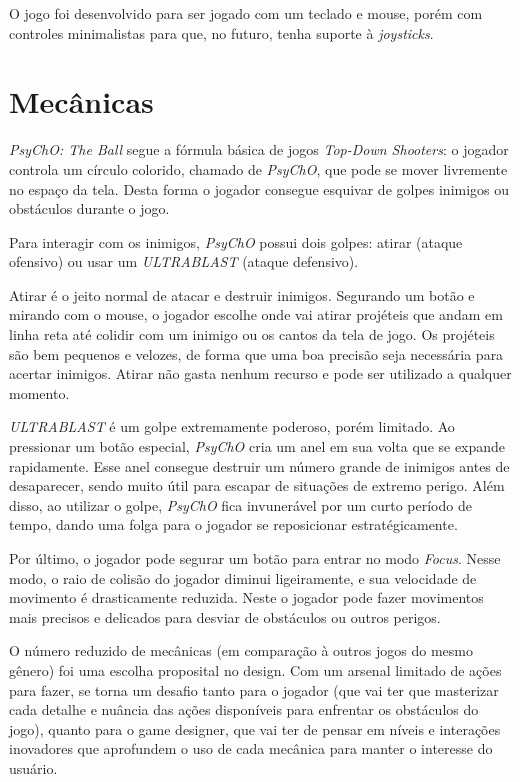 O jogo foi desenvolvido para ser jogado com um teclado e mouse, porém com controles minimalistas para que, no futuro, tenha suporte à \textit{joysticks}.

\section{Mecânicas}
\label{sec:mecanicas}

\textit{PsyChO: The Ball} segue a fórmula básica de jogos \textit{Top-Down Shooters}: o jogador controla um círculo colorido, chamado de \textit{PsyChO},
que pode se mover livremente no espaço da tela. Desta forma o jogador consegue esquivar de golpes inimigos ou obstáculos durante o jogo.

Para interagir com os inimigos, \textit{PsyChO} possui dois golpes: atirar (ataque ofensivo) ou usar um \textit{ULTRABLAST} (ataque defensivo).

Atirar é o jeito normal de atacar e destruir inimigos. Segurando um botão e mirando com o mouse, o jogador escolhe onde vai atirar projéteis que andam em
linha reta até colidir com um inimigo ou os cantos da tela de jogo. Os projéteis são bem pequenos e velozes, de forma que uma boa precisão seja necessária para
acertar inimigos. Atirar não gasta nenhum recurso e pode ser utilizado a qualquer momento.

\textit{ULTRABLAST} é um golpe extremamente poderoso, porém limitado. Ao pressionar um botão especial, \textit{PsyChO} cria um anel
em sua volta que se expande rapidamente. Esse anel consegue destruir um número grande de inimigos antes de desaparecer, sendo muito útil para escapar de situações
de extremo perigo. Além disso, ao utilizar o golpe, \textit{PsyChO} fica invunerável por um curto período de tempo, dando uma folga para o jogador
se reposicionar estratégicamente.

Por último, o jogador pode segurar um botão para entrar no modo \textit{Focus}. Nesse modo, o raio de colisão do jogador diminui ligeiramente, e sua velocidade de
movimento é drasticamente reduzida. Neste o jogador pode fazer movimentos mais precisos e delicados para desviar de obstáculos ou outros perigos.

O número reduzido de mecânicas (em comparação à outros jogos do mesmo gênero) foi uma escolha proposital no design. Com um arsenal limitado de ações para fazer,
se torna um desafio tanto para o jogador (que vai ter que masterizar cada detalhe e nuância das ações disponíveis para enfrentar os obstáculos do jogo), quanto para o game designer,
que vai ter de pensar em níveis e interações inovadores que aprofundem o uso de cada mecânica para manter o interesse do usuário.

